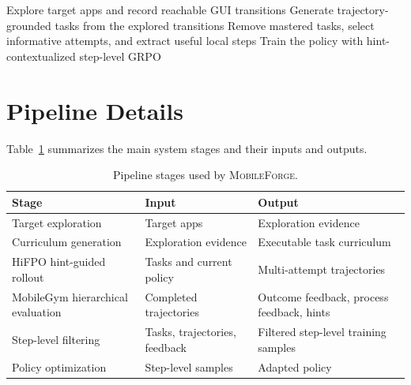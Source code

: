 \documentclass{llmxive}
\providecommand{\ourmethod}{\textsc{MobileForge}\xspace}
\providecommand{\paperTable}{  \small
  \setlength{\tabcolsep}{4.5pt}  \renewcommand{\arraystretch}{1.12}}
\begin{document}
\begin{algorithm}[t]
\caption{\ourmethod annotation-free adaptation loop}
\label{alg:mobileforge}
Explore target apps and record reachable GUI transitions\;
Generate trajectory-grounded tasks from the explored transitions\;
Remove mastered tasks, select informative attempts, and extract useful local steps\;
Train the policy with hint-contextualized step-level GRPO\;
\;
\end{algorithm}

\section{Pipeline Details}
\label{sec:appendix_pipeline}

Table~\ref{tab:appendix_pipeline} summarizes the main system stages and their inputs and outputs.

\begin{table}[t]
\centering
\paperTable
\begin{tabular}{@{}l l l@{}}
\toprule
\textbf{Stage} & \textbf{Input} & \textbf{Output} \\
\midrule
Target exploration & Target apps & Exploration evidence \\
Curriculum generation & Exploration evidence & Executable task curriculum \\
HiFPO hint-guided rollout & Tasks and current policy & Multi-attempt trajectories \\
MobileGym hierarchical evaluation & Completed trajectories & Outcome feedback, process feedback, hints \\
Step-level filtering & Tasks, trajectories, feedback & Filtered step-level training samples \\
Policy optimization & Step-level samples & Adapted policy \\
\bottomrule
\end{tabular}
\caption{Pipeline stages used by \ourmethod.}
\label{tab:appendix_pipeline}
\end{table}
\end{document}
